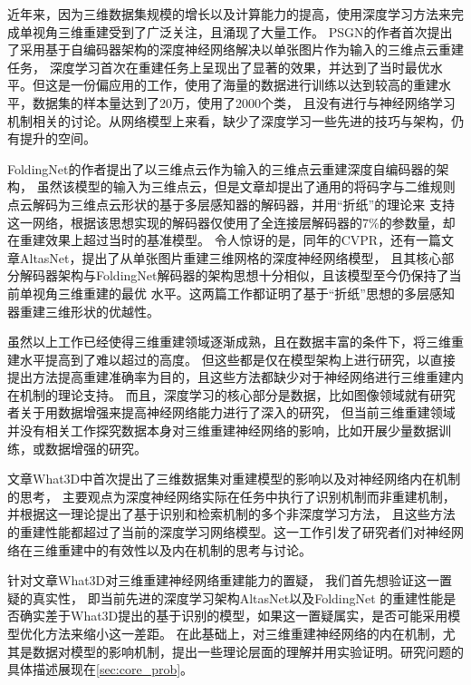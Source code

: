\documentclass[bachelor, nocolorlinks, printoneside]{seuthesis} %
\begin{document}
\begin{Main}
近年来，因为三维数据集规模的增长以及计算能力的提高，使用深度学习方法来完成单视角三维重建受到了广泛关注，且涌现了大量工作。
PSGN\cite{fan2017point}的作者首次提出了采用基于自编码器架构的深度神经网络解决以单张图片作为输入的三维点云重建任务，
深度学习首次在重建任务上呈现出了显著的效果，并达到了当时最优水平。但这是一份偏应用的工作，使用了海量的数据进行训练以达到较高的重建水平，数据集的样本量达到了20万，使用了2000个类，
且没有进行与神经网络学习机制相关的讨论。从网络模型上来看，缺少了深度学习一些先进的技巧与架构，仍有提升的空间。

FoldingNet\cite{yang2018foldingnet}的作者提出了以三维点云作为输入的三维点云重建深度自编码器的架构，
虽然该模型的输入为三维点云，但是文章却提出了通用的将码字与二维规则点云解码为三维点云形状的基于多层感知器的解码器，并用“折纸”的理论来
支持这一网络，根据该思想实现的解码器仅使用了全连接层解码器的7\%的参数量，却在重建效果上超过当时的基准模型。
令人惊讶的是，同年的CVPR，还有一篇文章AltasNet\cite{Groueix_2018}，提出了从单张图片重建三维网格的深度神经网络模型，
且其核心部分解码器架构与FoldingNet\cite{yang2018foldingnet}解码器的架构思想十分相似，且该模型至今仍保持了当前单视角三维重建的最优
水平。这两篇工作都证明了基于“折纸”思想的多层感知器重建三维形状的优越性。

虽然以上工作已经使得三维重建领域逐渐成熟，且在数据丰富的条件下，将三维重建水平提高到了难以超过的高度。
但这些都是仅在模型架构上进行研究，以直接提出方法提高重建准确率为目的，且这些方法都缺少对于神经网络进行三维重建内在机制的理论支持。
而且，深度学习的核心部分是数据，比如图像领域就有研究者关于用数据增强来提高神经网络能力进行了深入的研究，
但当前三维重建领域并没有相关工作探究数据本身对三维重建神经网络的影响，比如开展少量数据训练，或数据增强的研究。

文章What3D\cite{tatarchenko2019single}中首次提出了三维数据集对重建模型的影响以及对神经网络内在机制的思考，
主要观点为深度神经网络实际在任务中执行了识别机制而非重建机制，并根据这一理论提出了基于识别和检索机制的多个非深度学习方法，
且这些方法的重建性能都超过了当前的深度学习网络模型。这一工作引发了研究者们对神经网络在三维重建中的有效性以及内在机制的思考与讨论。

针对文章What3D\cite{tatarchenko2019single}对三维重建神经网络重建能力的置疑，
我们首先想验证这一置疑的真实性，
即当前先进的深度学习架构AltasNet\cite{Groueix_2018}以及FoldingNet\cite{yang2018foldingnet}
的重建性能是否确实差于What3D\cite{tatarchenko2019single}提出的基于识别的模型，如果这一置疑属实，是否可能采用模型优化方法来缩小这一差距。
在此基础上，对三维重建神经网络的内在机制，尤其是数据对模型的影响机制，提出一些理论层面的理解并用实验证明。研究问题的具体描述展现在\ref{sec:core_prob}。


\end{Main}
\end{document}

